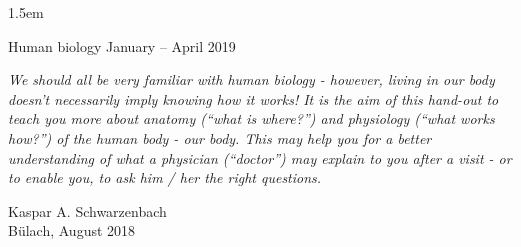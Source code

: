 \documentclass[ 	%
				 fontsize=10pt,%
				 paper=a4,%
				 headinclude=true, footinclude=false, %
				 parskip=half-,%
				 footsepline,headsepline, %
				 mpinclude=true, %
				 twoside%
		 ]{skript-saz}
\begin{document}
\label{BEGINDOKU}

\emergencystretch 1.5em
\hfuzz 0.3pt
\vfuzz \hfuzz
\raggedbottom
	 \areaset[0cm]{14cm}{25cm}   %
\begin{center} \vspace{6cm}
 {   \fontsize{44pt}{50pt} \selectfont
Human biology January -- April 2019}

\vspace{2em}
\textsl{We should all be very familiar with human biology - however, living in our body doesn't necessarily imply knowing how it works! It is the aim of this hand-out to teach you more about anatomy ("`what is where?"') and physiology ("`what works how?"') of the human body - our body. This may help you for a better understanding of what a physician ("`\textit{doctor}"') may explain to you after a visit - or to enable you, to ask him / her the right questions.}
\end{center}

\begin{flushright}
	Kaspar A. Schwarzenbach\\
	Bülach, August 2018
\end{flushright}
\vspace{2cm}
%
%


		\thispagestyle{plain} %
		\cleardoubleoddplainpage %
\end{document}

